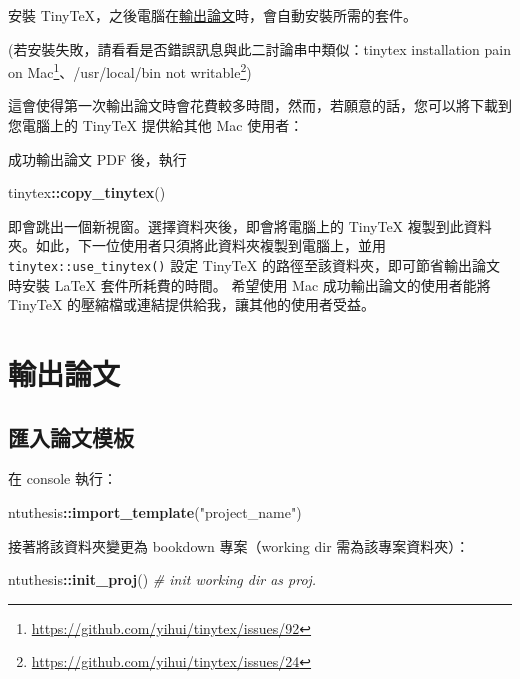 \documentclass[oneside]{book}
\newenvironment{Shaded}{\begin{snugshade}}{\end{snugshade}}
\newcommand{\CommentTok}[1]{\textcolor[rgb]{0.56,0.35,0.01}{\textit{#1}}}
\newcommand{\KeywordTok}[1]{\textcolor[rgb]{0.13,0.29,0.53}{\textbf{#1}}}
\newcommand{\NormalTok}[1]{#1}
\newcommand{\OperatorTok}[1]{\textcolor[rgb]{0.81,0.36,0.00}{\textbf{#1}}}
\newcommand{\StringTok}[1]{\textcolor[rgb]{0.31,0.60,0.02}{#1}}
\renewcommand{\href}[2]{#2\footnote{\url{#1}}}
\theoremstyle{definition}
\theoremstyle{definition}
\theoremstyle{definition}
\theoremstyle{remark}
\begin{document}
安裝 TinyTeX，之後電腦在\protect\hyperlink{export-thesis}{輸出論文}時，會自動安裝所需的套件。

(若安裝失敗，請看看是否錯誤訊息與此二討論串中類似：\href{https://github.com/yihui/tinytex/issues/92}{tinytex installation pain on Mac}、\href{https://github.com/yihui/tinytex/issues/24}{/usr/local/bin not writable})

這會使得第一次輸出論文時會花費較多時間，然而，若願意的話，您可以將下載到您電腦上的 TinyTeX 提供給其他 Mac 使用者：

成功輸出論文 PDF 後，執行

\begin{Shaded}
\begin{Highlighting}[]
\NormalTok{tinytex}\OperatorTok{::}\KeywordTok{copy_tinytex}\NormalTok{()}
\end{Highlighting}
\end{Shaded}

即會跳出一個新視窗。選擇資料夾後，即會將電腦上的 TinyTeX 複製到此資料夾。如此，下一位使用者只須將此資料夾複製到電腦上，並用 \texttt{tinytex::use\_tinytex()} 設定 TinyTeX 的路徑至該資料夾，即可節省輸出論文時安裝 LaTeX 套件所耗費的時間。
希望使用 Mac 成功輸出論文的使用者能將 TinyTeX 的壓縮檔或連結提供給我，讓其他的使用者受益。

\hypertarget{export-thesis}{%
\chapter{輸出論文}\label{export-thesis}}

\hypertarget{import-template}{%
\section{匯入論文模板}\label{import-template}}

在 console 執行：

\begin{Shaded}
\begin{Highlighting}[]
\NormalTok{ntuthesis}\OperatorTok{::}\KeywordTok{import_template}\NormalTok{(}\StringTok{"project_name"}\NormalTok{)}
\end{Highlighting}
\end{Shaded}

接著將該資料夾變更為 bookdown 專案（working dir 需為該專案資料夾）：

\begin{Shaded}
\begin{Highlighting}[]
\NormalTok{ntuthesis}\OperatorTok{::}\KeywordTok{init_proj}\NormalTok{()  }\CommentTok{# init working dir as proj.}
\end{Highlighting}
\end{Shaded}
\end{document}
